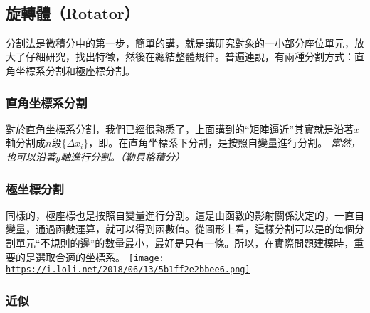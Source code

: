 \documentclass[11pt]{article}
\makeatletter
\def\maxwidth{\ifdim\Gin@nat@width>\linewidth\linewidth
    \else\Gin@nat@width\fi}
\let\Oldincludegraphics\includegraphics
\renewcommand{\includegraphics}[1]{\Oldincludegraphics[width=.8\maxwidth]{#1}}
\makeatother
\begin{document}
    \begin{center}
    \end{center}
    { \hspace*{\fill} \\}
    
    \hypertarget{ux65cbux8f49ux9ad4rotator}{%
\subsection{旋轉體（Rotator）}\label{ux65cbux8f49ux9ad4rotator}}

分割法是微積分中的第一步，簡單的講，就是講研究對象的一小部分座位單元，放大了仔細研究，找出特徵，然後在總結整體規律。普遍連說，有兩種分割方式：直角坐標系分割和極座標分割。

\hypertarget{ux76f4ux89d2ux5750ux6a19ux7cfbux5206ux5272}{%
\subsubsection{直角坐標系分割}\label{ux76f4ux89d2ux5750ux6a19ux7cfbux5206ux5272}}

對於直角坐標系分割，我們已經很熟悉了，上面講到的``矩陣逼近''其實就是沿著\(x\)軸分割成\(n\)段\(\{\Delta x_i\}\)，即。在直角坐標系下分割，是按照自變量進行分割。
\emph{當然，也可以沿著\(y\)軸進行分割。（勒貝格積分）}

    \hypertarget{ux6975ux5750ux6a19ux5206ux5272}{%
\subsubsection{極坐標分割}\label{ux6975ux5750ux6a19ux5206ux5272}}

同樣的，極座標也是按照自變量進行分割。這是由函數的影射關係決定的，一直自變量，通過函數運算，就可以得到函數值。從圖形上看，這樣分割可以是的每個分割單元``不規則的邊''的數量最小，最好是只有一條。所以，在實際問題建模時，重要的是選取合適的坐標系。
\href{https://i.loli.net/2018/06/13/5b1ff2e2bbee6.png}{\texttt{[image: https://i.loli.net/2018/06/13/5b1ff2e2bbee6.png]}}

    \hypertarget{ux8fd1ux4f3c}{%
\subsubsection{近似}\label{ux8fd1ux4f3c}}
\end{document}
